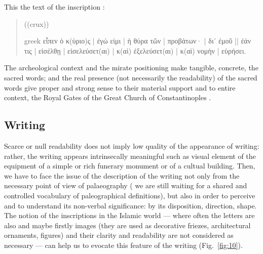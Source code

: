 \documentclass[amsthm,ebook]{saparticle}
\begin{document}
This the text of the inscription \citep[n. 505]{felle_biblia_2006}: 

\begin{quotation}
((crux)) \begin{otherlanguage*}{greek}
εἶπεν ὁ κ(ύριο)ς \textlatin{|} ἐγώ εἰμι \textlatin{|} ἡ θύρα τῶν \textlatin{|} προβάτων· \textlatin{|} δι᾿ ἐμοῦ \textlatin{||} ἐάν τις \textlatin{|} εἰσέλθῃ \textlatin{|} εἰσελεύσετ(αι) \textlatin{|} κ(αὶ) ἐξελεύσετ(αι) \textlatin{|} κ(αὶ) νομὴν \textlatin{|} εὑρήσει.
\end{otherlanguage*}


\end{quotation}

The archeological context and the mirate positioning make tangible, concrete, the sacred words; and the real presence
(not necessarily the readability) of the sacred words give proper and strong sense to their material support and to
entire context, the Royal Gates of the Great Church of Constantinoples \citep[320 and \emph{passim}]{felle_esporre_2015}.


\vspace{2cm}

\subsection{Writing}


\noindent Scarce or null readability does not imply low quality of the appearance of writing: rather, the writing appears
intrinsecally meaningful such as visual element of the equipment of a simple or rich funerary monument or of a cultual
building. Then, we have to face the issue of the description of the writing not only from the necessary point of
view of palaeography ( we are still waiting for a shared and controlled vocabulary of paleographical definitions), but
also in order to perceive and to understand its non-verbal significance: by its disposition, direction, shape. The
notion of the inscriptions in the Islamic world --- where often the letters are also and maybe firstly images (they
are used as decorative friezes, architectural ornaments, figures) and their clarity and readability are not considered
as necessary --- can help us to evocate this feature of the writing (Fig.~\ref{fig:10}).
\end{document}
